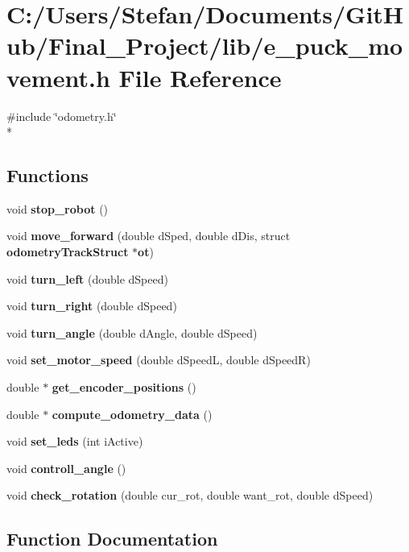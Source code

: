 \section{C\-:/\-Users/\-Stefan/\-Documents/\-Git\-Hub/\-Final\-\_\-\-Project/lib/e\-\_\-puck\-\_\-movement.h File Reference}
\label{lib_2e__puck__movement_8h}
{\ttfamily \#include \char`\"{}odometry.\-h\char`\"{}}\\*
\subsection*{Functions}
\begin{DoxyCompactItemize}
\item 
void {\bf stop\-\_\-robot} ()
\item 
void {\bf move\-\_\-forward} (double d\-Sped, double d\-Dis, struct {\bf odometry\-Track\-Struct} $\ast${\bf ot})
\item 
void {\bf turn\-\_\-left} (double d\-Speed)
\item 
void {\bf turn\-\_\-right} (double d\-Speed)
\item 
void {\bf turn\-\_\-angle} (double d\-Angle, double d\-Speed)
\item 
void {\bf set\-\_\-motor\-\_\-speed} (double d\-Speed\-L, double d\-Speed\-R)
\item 
double $\ast$ {\bf get\-\_\-encoder\-\_\-positions} ()
\item 
double $\ast$ {\bf compute\-\_\-odometry\-\_\-data} ()
\item 
void {\bf set\-\_\-leds} (int i\-Active)
\item 
void {\bf controll\-\_\-angle} ()
\item 
void {\bf check\-\_\-rotation} (double cur\-\_\-rot, double want\-\_\-rot, double d\-Speed)
\end{DoxyCompactItemize}


\subsection{Function Documentation}
